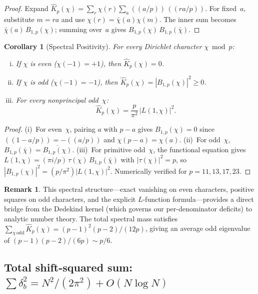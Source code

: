 \documentclass[11pt]{article}
\newtheorem{corollary}[theorem]{Corollary}
\theoremstyle{definition}
\newtheorem{remark}[theorem]{Remark}
\begin{document}
\begin{proof}
Expand $\hat{K}_p(\chi) = \sum_r \chi(r) \sum_a ((a/p))\,((ra/p))$.
For fixed~$a$, substitute $m = ra$ and use $\chi(r) = \bar{\chi}(a)\chi(m)$.
The inner sum becomes $\bar{\chi}(a)\,B_{1,p}(\chi)$; summing over~$a$
gives $B_{1,p}(\chi)\,B_{1,p}(\bar{\chi})$.
\end{proof}

\begin{corollary}[Spectral Positivity]\label{cor:spectral-pos}
For every Dirichlet character $\chi \bmod p$:
\begin{enumerate}[(i)]
  \item If $\chi$ is even ($\chi(-1) = +1$), then $\hat{K}_p(\chi) = 0$.
  \item If $\chi$ is odd ($\chi(-1) = -1$), then
    $\hat{K}_p(\chi) = |B_{1,p}(\chi)|^2 \ge 0$.
  \item For every nonprincipal odd~$\chi$:
    \begin{equation}
      \hat{K}_p(\chi) = \frac{p}{\pi^2}\,|L(1,\chi)|^2.
    \end{equation}
\end{enumerate}
\end{corollary}

\begin{proof}
(i)~For even~$\chi$, pairing $a$ with $p-a$ gives $B_{1,p}(\chi) = 0$
since $((1-a/p)) = -((a/p))$ and $\chi(p-a) = \chi(a)$.
(ii)~For odd~$\chi$, $B_{1,p}(\bar\chi) = \overline{B_{1,p}(\chi)}$.
(iii)~For primitive odd~$\chi$, the functional equation gives
$L(1,\chi) = (\pi i/p)\,\tau(\chi)\,B_{1,p}(\bar\chi)$
with $|\tau(\chi)|^2 = p$, so
$|B_{1,p}(\chi)|^2 = (p/\pi^2)|L(1,\chi)|^2$.
Numerically verified for $p = 11, 13, 17, 23$.
\end{proof}

\begin{remark}
This spectral structure---exact vanishing on even characters,
positive squares on odd characters, and the explicit $L$-function
formula---provides a direct bridge from the Dedekind kernel
(which governs our per-denominator deficits) to analytic number
theory.  The total spectral mass satisfies
$\sum_{\chi\,\mathrm{odd}} \hat{K}_p(\chi) = (p-1)^2(p-2)/(12p)$,
giving an average odd eigenvalue of $(p-1)(p-2)/(6p) \sim p/6$.
\end{remark}

\subsection{Total shift-squared sum: $\sum\delta_b^2 = N^2/(2\pi^2) + O(N\log N)$}
\end{document}
